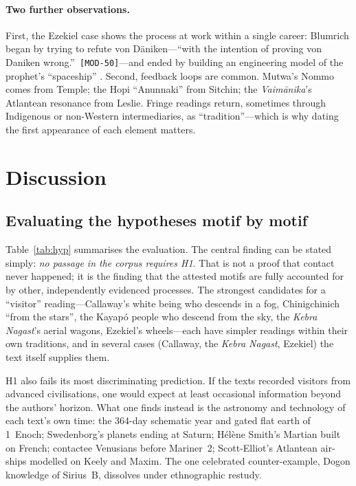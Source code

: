 \documentclass[11pt,a4paper]{article}
\newcommand{\pid}[1]{\texttt{\small #1}}
\begin{document}
\paragraph{Two further observations.} First, the Ezekiel case shows the process at work within a single career: Blumrich began by trying to refute von Däniken---\enquote{with the intention of proving von Daniken wrong.}~\pid{[MOD-50]}---and ended by building an engineering model of the prophet's ``spaceship'' \parencite{blumrich1974ezekiel}. Second, feedback loops are common. Mutwa's Nommo comes from Temple; the Hopi ``Anunnaki'' from Sitchin; the \emph{Vaimānika}'s Atlantean resonance from Leslie. Fringe readings return, sometimes through Indigenous or non-Western intermediaries, as ``tradition''---which is why dating the first appearance of each element matters.

\section{Discussion}\label{sec:discussion}

\subsection{Evaluating the hypotheses motif by motif}

Table~\ref{tab:hyp} summarises the evaluation. The central finding can be stated simply: \emph{no passage in the corpus requires H1}. That is not a proof that contact never happened; it is the finding that the attested motifs are fully accounted for by other, independently evidenced processes. The strongest candidates for a ``visitor'' reading---Callaway's white being who descends in a fog, Chinigchinich ``from the stars'', the Kayapó people who descend from the sky, the \emph{Kebra Nagast}'s aerial wagons, Ezekiel's wheels---each have simpler readings within their own traditions, and in several cases (Callaway, the \emph{Kebra Nagast}, Ezekiel) the text itself supplies them.

H1 also fails its most discriminating prediction. If the texts recorded visitors from advanced civilisations, one would expect at least occasional information beyond the authors' horizon. What one finds instead is the astronomy and technology of each text's own time: the 364-day schematic year and gated flat earth of 1~Enoch; Swedenborg's planets ending at Saturn; Hélène Smith's Martian built on French; contactee Venusians before Mariner~2; Scott-Elliot's Atlantean air-ships modelled on Keely and Maxim. The one celebrated counter-example, Dogon knowledge of Sirius~B, dissolves under ethnographic restudy.
\end{document}

